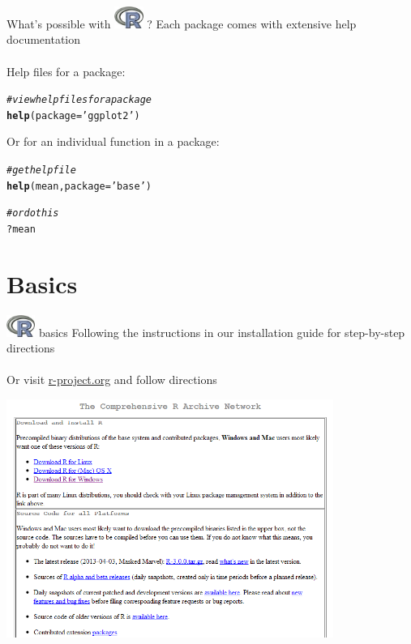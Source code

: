 \documentclass[xcolor=svgnames]{beamer}\usepackage[]{graphicx}\usepackage[]{color}
\makeatletter
\newcommand{\hlstr}[1]{\textcolor[rgb]{0.192,0.494,0.8}{#1}}%
\newcommand{\hlcom}[1]{\textcolor[rgb]{0.678,0.584,0.686}{\textit{#1}}}%
\newcommand{\hlopt}[1]{\textcolor[rgb]{0,0,0}{#1}}%
\newcommand{\hlstd}[1]{\textcolor[rgb]{0.345,0.345,0.345}{#1}}%
\newcommand{\hlkwc}[1]{\textcolor[rgb]{0.333,0.667,0.333}{#1}}%
\newcommand{\hlkwd}[1]{\textcolor[rgb]{0.737,0.353,0.396}{\textbf{#1}}}%
\newenvironment{kframe}{%
 \def\at@end@of@kframe{}%
 \ifinner\ifhmode%
  \def\at@end@of@kframe{\end{minipage}}%
  \begin{minipage}{\columnwidth}%
 \fi\fi%
 \def\FrameCommand##1{\hskip\@totalleftmargin \hskip-\fboxsep
 \colorbox{shadecolor}{##1}\hskip-\fboxsep
     \hskip-\linewidth \hskip-\@totalleftmargin \hskip\columnwidth}%
 \MakeFramed {\advance\hsize-\width
   \@totalleftmargin\z@ \linewidth\hsize
   \@setminipage}}%
 {\par\unskip\endMakeFramed%
 \at@end@of@kframe}
\newenvironment{knitrout}{}{} %
\makeatother
\begin{document}
\begin{frame}[t,fragile]{What's possible with \includegraphics[width=0.07\textwidth]{Rlogo.jpg} \hspace{0.2em}? }
Each package comes with extensive help documentation\\~\\
Help files for a package:
\begin{knitrout}
\color{fgcolor}\begin{kframe}
\begin{alltt}
\hlcom{# view help files for a package}
\hlkwd{help}\hlstd{(}\hlkwc{package} \hlstd{=} \hlstr{'ggplot2'}\hlstd{)}
\end{alltt}
\end{kframe}
\end{knitrout}
Or for an individual function in a package:
\begin{knitrout}
\color{fgcolor}\begin{kframe}
\begin{alltt}
\hlcom{# get help file}
\hlkwd{help}\hlstd{(mean,} \hlkwc{package} \hlstd{=} \hlstr{'base'}\hlstd{)}

\hlcom{# or do this}
\hlopt{?}\hlstd{mean}
\end{alltt}
\end{kframe}
\end{knitrout}
\end{frame}


\section{Basics}
\begin{frame}[t]{\includegraphics[width=0.07\textwidth]{Rlogo.jpg} \hspace{0.01in} basics}
Following the instructions in our installation guide for step-by-step directions \\~\\
Or visit \href{http://cran.us.r-project.org/}{r-project.org} and follow directions
\centerline{\includegraphics[width = 0.8\textwidth]{download.png}}
\end{frame}
\end{document}
